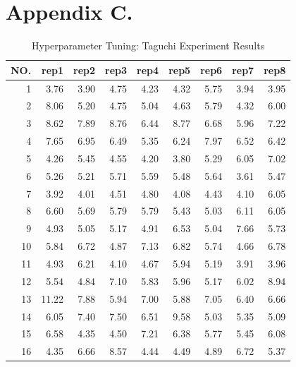 \chapter{Appendix C.}
\label{chap:appendix_c}
\begin{table}[ht]

	\centering
	\begin{tabular}{ rrrrrrrrr }
		\hline
		NO.& rep1 & rep2 & rep3 & rep4 & rep5 & rep6 & rep7 & rep8\\
  		\hline
		1 & 3.76 & 3.90 & 4.75 & 4.23 & 4.32 & 5.75 & 3.94 & 3.95 \\ 
		2 & 8.06 & 5.20 & 4.75 & 5.04 & 4.63 & 5.79 & 4.32 & 6.00 \\ 
		3 & 8.62 & 7.89 & 8.76 & 6.44 & 8.77 & 6.68 & 5.96 & 7.22 \\ 
		4 & 7.65 & 6.95 & 6.49 & 5.35 & 6.24 & 7.97 & 6.52 & 6.42 \\ 
		5 & 4.26 & 5.45 & 4.55 & 4.20 & 3.80 & 5.29 & 6.05 & 7.02 \\ 
		6 & 5.26 & 5.21 & 5.71 & 5.59 & 5.48 & 5.64 & 3.61 & 5.47 \\ 
		7 & 3.92 & 4.01 & 4.51 & 4.80 & 4.08 & 4.43 & 4.10 & 6.05 \\ 
		8 & 6.60 & 5.69 & 5.79 & 5.79 & 5.43 & 5.03 & 6.11 & 6.05 \\ 
		9 & 4.93 & 5.05 & 5.17 & 4.91 & 6.53 & 5.04 & 7.66 & 5.73 \\ 
		10 & 5.84 & 6.72 & 4.87 & 7.13 & 6.82 & 5.74 & 4.66 & 6.78 \\ 
		11 & 4.93 & 6.21 & 4.10 & 4.67 & 5.94 & 5.19 & 3.91 & 3.96 \\ 
		12 & 5.54 & 4.84 & 7.10 & 5.83 & 5.96 & 5.17 & 6.02 & 8.94 \\ 
		13 & 11.22 & 7.88 & 5.94 & 7.00 & 5.88 & 7.05 & 6.40 & 6.66 \\ 
		14 & 6.05 & 7.40 & 7.50 & 6.51 & 9.58 & 5.03 & 5.35 & 5.09 \\ 
		15 & 6.58 & 4.35 & 4.50 & 7.21 & 6.38 & 5.77 & 5.45 & 6.08 \\ 
		16 & 4.35 & 6.66 & 8.57 & 4.44 & 4.49 & 4.89 & 6.72 & 5.37 \\ 
		\hline
	\end{tabular}
	\caption{Hyperparameter Tuning: Taguchi Experiment Results}
	\label{tab:appendix:hyperparameter_tuning_final_taguchi}
\end{table}

